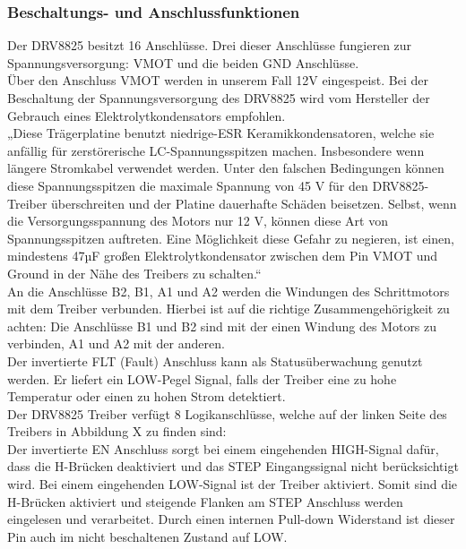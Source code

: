 \subsubsection{Beschaltungs- und Anschlussfunktionen}
Der DRV8825 besitzt 16 Anschlüsse.
Drei dieser Anschlüsse fungieren zur Spannungsversorgung: VMOT und die beiden GND Anschlüsse. \\

Über den Anschluss VMOT werden in unserem Fall 12V eingespeist.
Bei der Beschaltung der Spannungsversorgung des DRV8825 wird vom Hersteller der Gebrauch eines Elektrolytkondensators empfohlen. \\

„Diese Trägerplatine benutzt niedrige-ESR Keramikkondensatoren, welche sie anfällig für zerstörerische LC-Spannungsspitzen machen.
Insbesondere wenn längere Stromkabel verwendet werden.
Unter den falschen Bedingungen können diese Spannungsspitzen die maximale Spannung von 45 V für den DRV8825-Treiber überschreiten und der Platine dauerhafte Schäden beisetzen.
Selbst, wenn die Versorgungsspannung des Motors nur 12 V, können diese Art von Spannungsspitzen auftreten.
Eine Möglichkeit diese Gefahr zu negieren, ist einen, mindestens 47µF großen Elektrolytkondensator zwischen dem Pin VMOT und Ground in der Nähe des Treibers zu schalten.“ \\

An die Anschlüsse B2, B1, A1 und A2 werden die Windungen des Schrittmotors mit dem Treiber verbunden.
Hierbei ist auf die richtige Zusammengehörigkeit zu achten:
Die Anschlüsse B1 und B2 sind mit der einen Windung des Motors zu verbinden, A1 und A2 mit der anderen. \\

Der invertierte FLT (Fault)  Anschluss kann als Statusüberwachung genutzt werden.
Er liefert ein LOW-Pegel Signal, falls der Treiber eine zu hohe Temperatur oder einen zu hohen Strom detektiert. \\

Der DRV8825 Treiber verfügt 8 Logikanschlüsse, welche auf der linken Seite des Treibers in Abbildung X zu finden sind: \\

Der invertierte EN Anschluss sorgt bei einem eingehenden HIGH-Signal dafür, dass die H-Brücken deaktiviert und das STEP Eingangssignal nicht berücksichtigt wird.
Bei einem eingehenden LOW-Signal ist der Treiber aktiviert.
Somit sind die H-Brücken aktiviert und steigende Flanken am STEP Anschluss werden eingelesen und verarbeitet.
Durch einen internen Pull-down Widerstand ist dieser Pin auch im nicht beschaltenen Zustand auf LOW. \\

